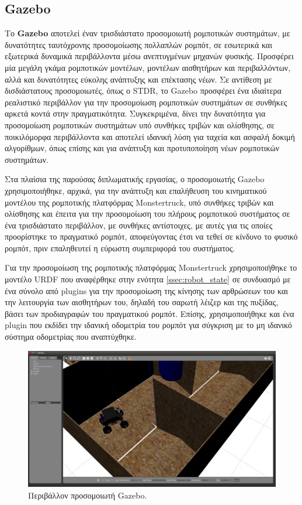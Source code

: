 \FloatBarrier

\subsection{Gazebo} \label{ssec:gazebo}
Το \textbf{Gazebo} αποτελεί έναν τρισδιάστατο προσομοιωτή ρομποτικών συστημάτων, με δυνατότητες ταυτόχρονης προσομοίωσης πολλαπλών ρομπότ, σε εσωτερικά και εξωτερικά δυναμικά περιβάλλοντα μέσω ανεπτυγμένων μηχανών φυσικής. Προσφέρει μία μεγάλη γκάμα ρομποτικών μοντέλων, μοντέλων αισθητήρων και περιβαλλόντων, αλλά και δυνατότητες εύκολης ανάπτυξης και επέκτασης νέων. Σε αντίθεση με δισδιάστατους προσομοιωτές, όπως ο STDR, το Gazebo προσφέρει ένα ιδιαίτερα ρεαλιστικό περιβάλλον για την προσομοίωση ρομποτικών συστημάτων σε συνθήκες αρκετά κοντά στην πραγματικότητα. Συγκεκριμένα, δίνει την δυνατότητα για προσομοίωση ρομποτικών συστημάτων υπό συνθήκες τριβών και ολίσθησης, σε ποικιλόμορφα περιβάλλοντα και αποτελεί ιδανική λύση για ταχεία και ασφαλή δοκιμή αλγορίθμων, όπως επίσης και για ανάπτυξη και προτυποποίηση νέων ρομποτικών συστημάτων.

\bigskip
Στα πλαίσια της παρούσας διπλωματικής εργασίας, ο προσομοιωτής Gazebo χρησιμοποιήθηκε, αρχικά, για την ανάπτυξη και επαλήθευση του κινηματικού μοντέλου της ρομποτικής πλατφόρμας Monstertruck, υπό συνθήκες τριβών και ολίσθησης και έπειτα για την προσομοίωση του πλήρους ρομποτικού συστήματος σε ένα τρισδιάστατο περιβάλλον, με συνθήκες αντίστοιχες, με αυτές για τις οποίες προορίστηκε το πραγματικό ρομπότ, αποφεύγοντας έτσι να τεθεί σε κίνδυνο το φυσικό ρομπότ, πριν επαληθευτεί η εύρωστη συμπεριφορά του συστήματος.

\bigskip
Για την προσομοίωση της ρομποτικής πλατφόρμας Monstertruck χρησιμοποιήθηκε το μοντέλο URDF που αναφέρθηκε στην ενότητα \ref{ssec:robot_state} σε συνδυασμό με ένα σύνολο από plugins για την προσομοίωση της κίνησης των αρθρώσεων του και την λειτουργία των αισθητήρων του, δηλαδή του σαρωτή λέιζερ και της πυξίδας, βάσει των προδιαγραφών του πραγματικού ρομπότ. Επίσης, χρησιμοποιήθηκε και ένα plugin που εκδίδει την ιδανική οδομετρία του ρομπότ για σύγκριση με το μη ιδανικό σύστημα οδομετρίας που αναπτύχθηκε.

\bigskip
\begin{figure}[!ht]
	\centering
	\includegraphics[width=0.7\linewidth]{Chapters/Chapter4/Figures/gazebo_simulator.jpg}
	\caption{Περιβάλλον προσομοιωτή Gazebo.}
	\label{fig:gazebo_simulator}
\end{figure}


